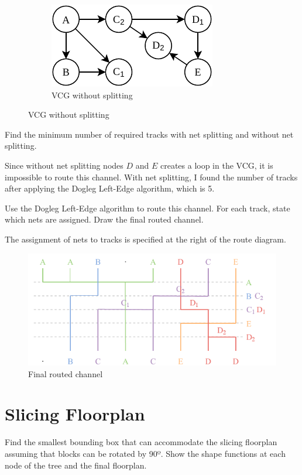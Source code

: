 \documentclass[a4paper, 10pt]{article}
\begin{document}
\begin{figure}[htbp]
    \hfill
    \begin{subfigure}{0.32\textwidth}
        \centering
        \includegraphics[width=\linewidth]{2_vcg_split.pdf}
        \caption{VCG without splitting}
        \label{}
    \end{subfigure}
\end{figure}


{\color{statement} Find the minimum number of required tracks with net splitting and without net splitting.}

Since without net splitting nodes $D$ and $E$ creates a loop in the VCG, it is impossible to route this channel.  With net splitting, I found the number of tracks after applying the Dogleg Left-Edge algorithm, which is 5. 

{\color{statement} Use the Dogleg Left-Edge algorithm to route this channel. For each track, state which nets are assigned. Draw the final routed channel.}

The assignment of nets to tracks is specified at the right of the route diagram.
\begin{figure}[H]
    \centering
    \includegraphics[width=1\linewidth]{2_route.pdf}
    \caption{Final routed channel}
\end{figure}
\newpage
\section{Slicing Floorplan}
{\color{statement} Find the smallest bounding box that can accommodate the slicing floorplan assuming that blocks can be rotated by 90º. Show the shape functions at each node of the tree and the final floorplan.}
\end{document}
